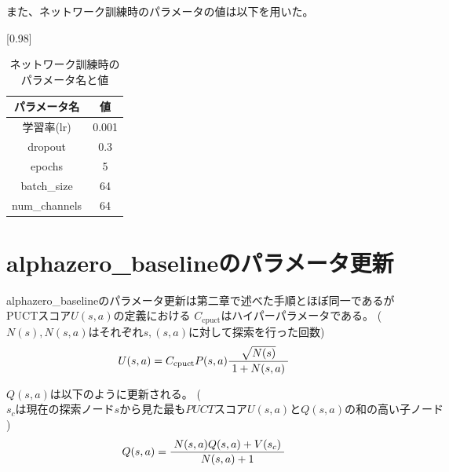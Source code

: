 また、ネットワーク訓練時のパラメータの値は以下を用いた。
\begin{table}[H]
	\caption{ネットワーク訓練時のパラメータ名と値}
	\centering
	\scalebox{0.98}[0.98]{
		\begin{tabular}{c|c}
			パラメータ名 & 値 \\ \hline
			学習率(lr)    & 0.001 \\ 
			dropout    & 0.3 \\
			epochs      & 5 \\
			batch\_size     & 64 \\
			num\_channels  & 64 \\
		\end{tabular}
	}
	\label{table:param-train}
\end{table}
\section{alphazero\_baselineのパラメータ更新}
alphazero\_baselineのパラメータ更新は第二章で述べた手順とほぼ同一であるがPUCTスコア$U(s, a)$の定義における
$ C_{\textrm{cpuct}}$はハイパーパラメータである。
($N(s), N(s, a)はそれぞれs,(s, a)に対して探索を行った回数$)
\begin{equation}
	{U(s, a)= C_{\textrm{cpuct}}P(s, a)\frac{\sqrt{N(s)}}{1+N(s, a)}\\
	}
\end{equation}

$Q(s, a)$は以下のように更新される。
($s_cは現在の探索ノードsから見た最もPUCTスコアU(s, a)とQ(s, a)の和の高い子ノード$)
\begin{equation}
	{Q(s, a)=\frac{N(s, a)Q(s, a)+V(s_c)}{N(s, a)+1}\\
	}
\end{equation}

\newpage

